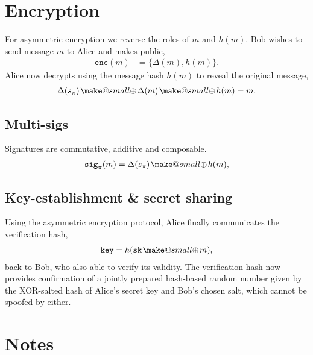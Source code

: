 \documentclass[twocolumn, aps, amsmath, amssymb, nofootinbib, superscriptaddress, longbibliography, doublefloatfix, table-of-contents, eqsecnum, rmp]{revtex4-2}
\makeatletter
\newcommand{\soplus}{{{\hspace{1pt}}{\mathbin{\mathpalette\make@small\oplus}}}{\hspace{1pt}}}
\newcommand{\make@small}[2]{%
  \vcenter{\hbox{%
    \scalebox{0.6}{$\m@th#1#2$}%
  }}%
}
\makeatother
\begin{document}

\section{Encryption}

For asymmetric encryption we reverse the roles of $m$ and $h(m)$. Bob wishes to send message $m$ to Alice and makes public,
\begin{align}
	\mathtt{enc}(m) &= \{\Delta(m), h(m)\}. 
\end{align}
Alice now decrypts using the message hash $h(m)$ to reveal the original message,
\begin{align}
	\Delta(s_\pi) \soplus \Delta(m) \soplus h(m) = m.
\end{align}

\subsection{Multi-sigs}

Signatures are commutative, additive and composable.
\begin{align}
	\mathtt{sig}_\pi(m) = \Delta(s_\pi) \soplus h(m),
\end{align}

\subsection{Key-establishment \& secret sharing}

Using the asymmetric encryption protocol, Alice finally communicates the verification hash,
\begin{align}
	\mathtt{key} = h(\mathtt{sk}\soplus m),
\end{align}
back to Bob, who also able to verify its validity. The verification hash now provides confirmation of a jointly prepared hash-based random number given by  the XOR-salted hash of Alice's secret key and Bob's chosen salt, which cannot be spoofed by either.

\section{Notes}
\end{document}
